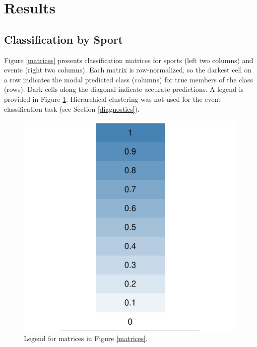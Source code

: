 \documentclass[12pt,letterpaper]{article} %
\begin{document}


\section{Results}

\subsection{Classification by Sport}

Figure \ref{matrices} presents classification matrices for sports (left two columns) and events (right two columns). Each matrix is row-normalized, so the darkest cell on a row indicates the modal predicted class (columns) for true members of the class (rows). Dark cells along the diagonal indicate accurate predictions. A legend is provided in Figure \ref{legend}. Hierarchical clustering was not used for the event classification task (see Section \ref{diagnostics}).



\begin{figure}
  \begin{center}
    \includegraphics[scale=0.2]{../graphics/scale.pdf}
  \end{center}
  \caption{Legend for matrices in Figure \ref{matrices}.}
  \label{legend}
\end{figure}
\end{document}
